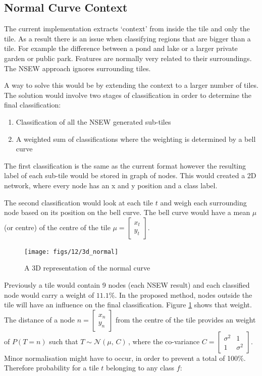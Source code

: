 \subsection{Normal Curve Context}
The current implementation extracts `context' from inside the tile and only the tile. As a result there is an issue when classifying regions that are bigger than a tile. For example the difference between a pond and lake or a larger private garden or public park. Features are normally very related to their surroundings. The NSEW approach ignores  surrounding tiles.

A way to solve this would be by extending the context to a larger number of tiles. The solution would involve two stages of classification in order to determine the final classification: 
\begin{enumerate}
\item Classification of all the NSEW generated sub-tiles
\item A weighted sum of classifications where the weighting is determined by a bell curve

\end{enumerate}

The first classification is the same as the current format however the resulting label of each sub-tile would be stored in graph of nodes. This would created a 2D network, where every node has an x and y position and a class label. 


The second classification would look at each tile $t$ and weigh each surrounding node based on its position on the bell curve. The bell curve would have a mean $ \mu $ (or centre) of the centre of the tile $\mu = \begin{bmatrix}x_t \\ y_t \end{bmatrix}.$

\begin{figure}[H]
    \centering
    \texttt{[image: figs/12/3d\_normal]}
    \caption{A 3D representation of the normal curve}
    \label{fig:fw:3d_normal}
\end{figure}

Previously a tile would contain 9 nodes (each NSEW result) and each classified node would carry a weight of $11.1\%$. 
In the proposed method, nodes outside the tile will have an influence on the final classification. 
Figure \ref{fig:fw:3d_normal} shows that weight. 
The distance of a node $n = \begin{bmatrix}x_n \\ y_n \end{bmatrix}$
from the centre of the tile provides an weight of $P(T = n)$ 
such that $T \sim \mathcal{N}(\mu,\,C)\,$, 
where the co-variance $C  =\begin{bmatrix}\sigma^2 & 1 \\ 1 & \sigma^2 \end{bmatrix}$.\\
Minor normalisation might have to occur, in order to prevent a total of 100\%. 
Therefore probability for a tile $t$ belonging to any class $f$:

